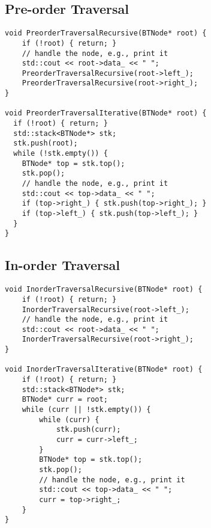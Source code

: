 \subsection{Pre-order Traversal}
\begin{lstlisting}
void PreorderTraversalRecursive(BTNode* root) {
	if (!root) { return; }
	// handle the node, e.g., print it
	std::cout << root->data_ << " ";
	PreorderTraversalRecursive(root->left_);
	PreorderTraversalRecursive(root->right_);
}

void PreorderTraversalIterative(BTNode* root) {
  if (!root) { return; }
  std::stack<BTNode*> stk;
  stk.push(root);
  while (!stk.empty()) {
    BTNode* top = stk.top();
    stk.pop();
    // handle the node, e.g., print it
    std::cout << top->data_ << " ";
    if (top->right_) { stk.push(top->right_); }
    if (top->left_) { stk.push(top->left_); }
  }
}
\end{lstlisting}

\subsection{In-order Traversal}
\begin{lstlisting}
void InorderTraversalRecursive(BTNode* root) {
	if (!root) { return; }
	InorderTraversalRecursive(root->left_);
	// handle the node, e.g., print it
	std::cout << root->data_ << " ";
	InorderTraversalRecursive(root->right_);
}

void InorderTraversalIterative(BTNode* root) {
	if (!root) { return; }
	std::stack<BTNode*> stk;
	BTNode* curr = root;
	while (curr || !stk.empty()) {
		while (curr) {
			stk.push(curr);
			curr = curr->left_;
		}
		BTNode* top = stk.top();
		stk.pop();
		// handle the node, e.g., print it
		std::cout << top->data_ << " ";
		curr = top->right_;
	}
}

\end{lstlisting}

